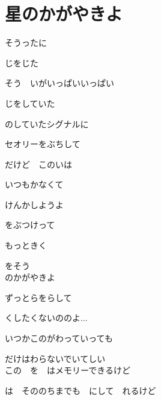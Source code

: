 \section{ 星のかがやきよ}


\large{

そうったに　

じをじた

そう　いがいっぱいいっぱい　

じをしていた

のしていたシグナルに　

セオリーをぶちして

だけど　このいは　

いつもかなくて

けんかしようよ　

をぶつけって

もっときく　

をそう
\\

のかがやきよ　

ずっとらをらして

くしたくないののよ...

いつかこのがわっていっても

だけはわらないでいてしい
\\

この　を　はメモリーできるけど

は　そののちまでも　にして　れるけど

}
